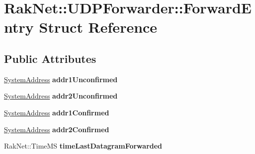 \hypertarget{struct_rak_net_1_1_u_d_p_forwarder_1_1_forward_entry}{\section{Rak\-Net\-:\-:U\-D\-P\-Forwarder\-:\-:Forward\-Entry Struct Reference}
\label{struct_rak_net_1_1_u_d_p_forwarder_1_1_forward_entry}
}
\subsection*{Public Attributes}
\begin{DoxyCompactItemize}
\item 
\hypertarget{struct_rak_net_1_1_u_d_p_forwarder_1_1_forward_entry_a225238972bc5dbefc30d261cc6766a02}{\hyperlink{struct_rak_net_1_1_system_address}{System\-Address} {\bfseries addr1\-Unconfirmed}}\label{struct_rak_net_1_1_u_d_p_forwarder_1_1_forward_entry_a225238972bc5dbefc30d261cc6766a02}

\item 
\hypertarget{struct_rak_net_1_1_u_d_p_forwarder_1_1_forward_entry_afc9b669b4e713789daa51637bfea48c3}{\hyperlink{struct_rak_net_1_1_system_address}{System\-Address} {\bfseries addr2\-Unconfirmed}}\label{struct_rak_net_1_1_u_d_p_forwarder_1_1_forward_entry_afc9b669b4e713789daa51637bfea48c3}

\item 
\hypertarget{struct_rak_net_1_1_u_d_p_forwarder_1_1_forward_entry_ab2c18cb40f08c2a6a054322bf8ec3d7a}{\hyperlink{struct_rak_net_1_1_system_address}{System\-Address} {\bfseries addr1\-Confirmed}}\label{struct_rak_net_1_1_u_d_p_forwarder_1_1_forward_entry_ab2c18cb40f08c2a6a054322bf8ec3d7a}

\item 
\hypertarget{struct_rak_net_1_1_u_d_p_forwarder_1_1_forward_entry_af9d3ae90f3b094b8e6eb0b82c25638bf}{\hyperlink{struct_rak_net_1_1_system_address}{System\-Address} {\bfseries addr2\-Confirmed}}\label{struct_rak_net_1_1_u_d_p_forwarder_1_1_forward_entry_af9d3ae90f3b094b8e6eb0b82c25638bf}

\item 
\hypertarget{struct_rak_net_1_1_u_d_p_forwarder_1_1_forward_entry_a34cb44ec2b2f58b3e30788b0335ea2aa}{Rak\-Net\-::\-Time\-M\-S {\bfseries time\-Last\-Datagram\-Forwarded}}\label{struct_rak_net_1_1_u_d_p_forwarder_1_1_forward_entry_a34cb44ec2b2f58b3e30788b0335ea2aa}


\end{DoxyCompactItemize}
